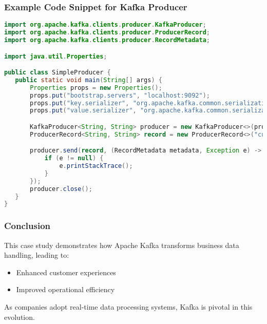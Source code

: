 \documentclass[aspectratio=169]{beamer}
\begin{document}
\begin{frame}[fragile]
  \frametitle{Example Code Snippet for Kafka Producer}
  \begin{lstlisting}[language=Java]
import org.apache.kafka.clients.producer.KafkaProducer;
import org.apache.kafka.clients.producer.ProducerRecord;
import org.apache.kafka.clients.producer.RecordMetadata;

import java.util.Properties;

public class SimpleProducer {
   public static void main(String[] args) {
       Properties props = new Properties();
       props.put("bootstrap.servers", "localhost:9092");
       props.put("key.serializer", "org.apache.kafka.common.serialization.StringSerializer");
       props.put("value.serializer", "org.apache.kafka.common.serialization.StringSerializer");

       KafkaProducer<String, String> producer = new KafkaProducer<>(props);
       ProducerRecord<String, String> record = new ProducerRecord<>("customer-transactions", "key1", "Purchase info");

       producer.send(record, (RecordMetadata metadata, Exception e) -> {
           if (e != null) {
               e.printStackTrace();
           }
       });
       producer.close();
   }
}
  \end{lstlisting}
\end{frame}

\begin{frame}
  \frametitle{Conclusion}
  This case study demonstrates how Apache Kafka transforms business data handling, leading to:
  \begin{itemize}
    \item Enhanced customer experiences
    \item Improved operational efficiency
  \end{itemize}
  
  As companies adopt real-time data processing systems, Kafka is pivotal in this evolution.
\end{frame}
\end{document}
